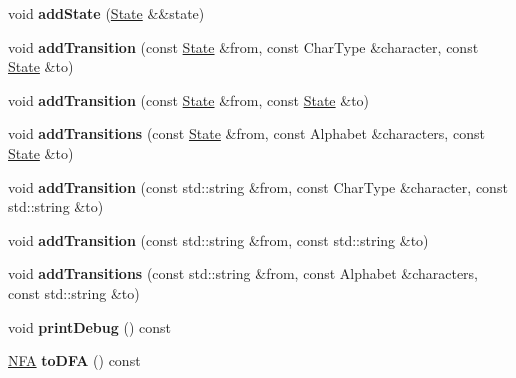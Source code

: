 \begin{DoxyCompactItemize}
\item 
void {\bfseries add\+State} (\hyperlink{structState}{State} \&\&state)\hypertarget{classNFA_a01d23e3617878eede7d7e162fa29a990}{}\label{classNFA_a01d23e3617878eede7d7e162fa29a990}

\item 
void {\bfseries add\+Transition} (const \hyperlink{structState}{State} \&from, const Char\+Type \&character, const \hyperlink{structState}{State} \&to)\hypertarget{classNFA_aa1be789eb438068c1297f81cebde3986}{}\label{classNFA_aa1be789eb438068c1297f81cebde3986}

\item 
void {\bfseries add\+Transition} (const \hyperlink{structState}{State} \&from, const \hyperlink{structState}{State} \&to)\hypertarget{classNFA_a8a806166448f5228f1cea02fb3c407e1}{}\label{classNFA_a8a806166448f5228f1cea02fb3c407e1}

\item 
void {\bfseries add\+Transitions} (const \hyperlink{structState}{State} \&from, const Alphabet \&characters, const \hyperlink{structState}{State} \&to)\hypertarget{classNFA_a84585fb96d8fbd4fa978f22389e22f12}{}\label{classNFA_a84585fb96d8fbd4fa978f22389e22f12}

\item 
void {\bfseries add\+Transition} (const std\+::string \&from, const Char\+Type \&character, const std\+::string \&to)\hypertarget{classNFA_a42e23c1d2b811f41410e77c3e3f1f97c}{}\label{classNFA_a42e23c1d2b811f41410e77c3e3f1f97c}

\item 
void {\bfseries add\+Transition} (const std\+::string \&from, const std\+::string \&to)\hypertarget{classNFA_abac152eeed3df6612b6a7ce30d3dc796}{}\label{classNFA_abac152eeed3df6612b6a7ce30d3dc796}

\item 
void {\bfseries add\+Transitions} (const std\+::string \&from, const Alphabet \&characters, const std\+::string \&to)\hypertarget{classNFA_ae81e75d4f68ca63090bf6eeb49f3f833}{}\label{classNFA_ae81e75d4f68ca63090bf6eeb49f3f833}

\item 
void {\bfseries print\+Debug} () const \hypertarget{classNFA_a53ad6f0fa9646d8ffab9427677833164}{}\label{classNFA_a53ad6f0fa9646d8ffab9427677833164}

\item 
\hyperlink{classNFA}{N\+FA} {\bfseries to\+D\+FA} () const \hypertarget{classNFA_ac6fde2f66abcaf39119e5e4ac86056eb}{}\label{classNFA_ac6fde2f66abcaf39119e5e4ac86056eb}

\end{DoxyCompactItemize}
